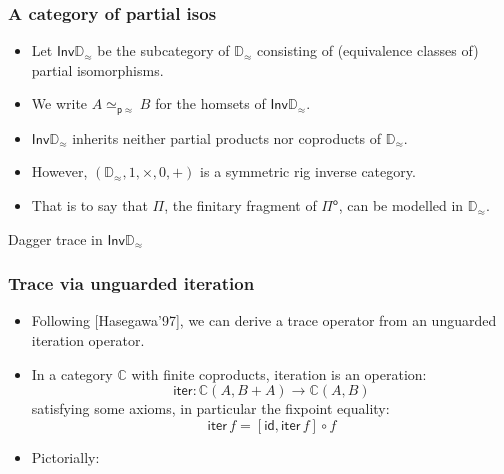 \documentclass[12pt,t]{beamer}
\newcommand{\C}{\mathbb{C}}
\newcommand{\Pio}{\ensuremath{\mathsf{\Pi}^{\mathsf{o}}}}
\newcommand{\copair}[2]{[#1,#2]}
\newcommand{\Inv}{\mathsf{Inv}}
\newcommand{\iter}{\mathsf{iter}}
\newcommand{\id}{\mathsf{id}}
\newcommand{\Dapprox}{\mathbb{D}_{\approx}}
\begin{document}
\begin{frame}

  \frametitle{A category of partial isos}
  \begin{itemize}
  \item Let $\Inv \Dapprox$ be the subcategory of $\Dapprox$
    consisting of (equivalence classes of) partial isomorphisms.
  \item We write $A \simeq_{\mathsf{p}\approx} B$ for the homsets of
    $\Inv \Dapprox$.
  \item $\Inv\Dapprox$ inherits neither partial products nor
    coproducts of $\Dapprox$.
  \item However, $(\Dapprox,1,\times,0,+)$ is a symmetric rig inverse category.
  \item That is to say that $\Pi$, the finitary fragment of
    \Pio, can be modelled in $\Dapprox$.
  \end{itemize}
  
  
\end{frame}

\begin{frame}[c]
  \begin{center}
    \Huge Dagger trace in $\Inv\Dapprox$ 
  \end{center}
\end{frame}

\begin{frame}

  \frametitle{Trace via unguarded iteration}

  \begin{itemize}

  \item Following [Hasegawa'97], we can derive a trace operator from
    an unguarded iteration operator.
  \item In a category $\C$ with finite coproducts,  iteration is an operation:
    \[
    \iter : \C (A ,B + A) \to \C(A , B)
    \]
    satisfying some axioms, in particular the fixpoint equality:
    \[
    \iter\,f = \copair {\id} {\iter \,f} \circ f
    \]
  \item Pictorially:
  \end{itemize}
  
\end{frame}
\end{document}
